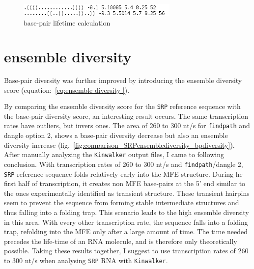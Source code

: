 \documentclass[ twoside,openright,titlepage,numbers=noenddot,headinclude,%
                footinclude=false, cleardoublepage=empty,abstractoff, %
                BCOR=5mm,paper=a4,fontsize=11pt,%
                ngerman,american,%
                ]{scrreprt}
\newcommand{\todo}[1]{{\color{green}\bfseries ** #1 **}}
\begin{document}
\begin{figure}[ht] 
\centering
\includegraphics[width=0.7\textwidth]{./pictures/TimeCalculation.png}
\caption{base-pair lifetime calculation}
\label{fig:fig_bp_lifetime_calculations}
\end{figure}		


 
\section{ensemble diversity}
Base-pair diversity was further improved by introducing the ensemble diversity score (equation:~\ref{eq:ensemble diversity
}).

By comparing the ensemble diversity score for the \texttt{SRP} reference sequence
with the base-pair diversity score, an interesting result occurs. The same
transcription rates have outliers, but invers ones. The area of 260 to 300 nt/s
for \texttt{findpath} and dangle option 2, shows a base-pair diversity
decrease but also an ensemble diversity increase (fig.~\ref{fig:comparison_SRPensemblediversity_bpdiversity}). After
manually analyzing the \texttt{Kinwalker} output files, I came to
following conclusion. With transcription rates of 260 to 300 nt/s and
\texttt{findpath}/dangle 2, \texttt{SRP} reference sequence folds relatively early into
the MFE structure. During he first half of transcription, it creates non
MFE base-pairs at the 5' end similar to the ones experimentally identified
as transient structure. These transient hairpins seem to prevent the
sequence from forming stable intermediate structures and thus falling into a folding trap.
This scenario leads to the high ensemble
diversity in this area. With every other transcription rate, the sequence
falls into a folding trap, refolding into the MFE only after a large amount
of time. The time needed precedes the life-time of an RNA molecule, and is
therefore only theoretically possible.
Taking these results together, I suggest to use transcription rates of
260 to 300 nt/s when analysing \texttt{SRP} RNA with \texttt{Kinwalker}.
\end{document}
